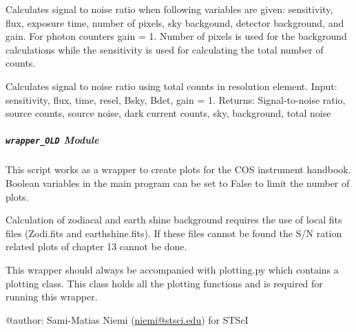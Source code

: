 \documentclass[letterpaper,10pt,english]{sphinxmanual}
\begin{document}
\begin{fulllineitems}
\label{SamPy.plot.COSIHB:SamPy.plot.COSIHB.wrapperSynphot.signalToNoise}
Calculates signal to noise ratio when following variables are given:
sensitivity, flux, exposure time, number of pixels, sky backgound, detector background, and gain.
For photon counters gain = 1. Number of pixels is used for the background calculations while the
sensitivity is used for calculating the total number of counts.

\end{fulllineitems}



\begin{fulllineitems}
\label{SamPy.plot.COSIHB:SamPy.plot.COSIHB.wrapperSynphot.signalToNoisePerResel}
Calculates signal to noise ratio using total counts in resolution element.
Input:
sensitivity, flux, time, resel, Bsky, Bdet, gain = 1.
Returns:
Signal-to-noise ratio, source counts, source noise, dark current counts, sky, background, total noise

\end{fulllineitems}



\subparagraph{\texttt{wrapper\_OLD} Module}
\label{SamPy.plot.COSIHB:module-SamPy.plot.COSIHB.wrapper_OLD}\label{SamPy.plot.COSIHB:wrapper-old-module}
This script works as a wrapper to create plots for the COS instrument handbook.
Boolean variables in the main program can be set to False to limit the number
of plots.

Calculation of zodiacal and earth shine background requires the use of local
fits files (Zodi.fits and earthshine.fits). If these files cannot be found
the S/N ration related plots of chapter 13 cannot be done.

This wrapper should always be accompanied with plotting.py which contains
a plotting class. This class holds all the plotting functions and is required
for running this wrapper.

@author: Sami-Matias Niemi (\href{mailto:niemi@stsci.edu}{niemi@stsci.edu}) for STScI
\end{document}
